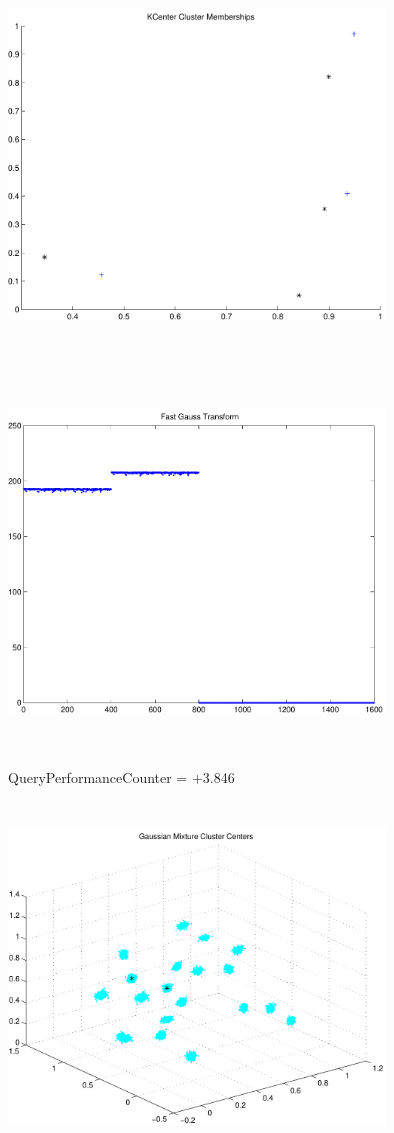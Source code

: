 \documentclass[9pt]{article}
\theoremstyle{plain}
\theoremstyle{definition}
\theoremstyle{remark}
\numberwithin{equation}{section}
\begin{document}
\includegraphics[width=10.0cm,height=10.0cm]{KCenterClusterMemberships_4_Centers.pdf}

\includegraphics[width=10.0cm,height=10.0cm]{FGT4_Centers.pdf}

QueryPerformanceCounter  =  +3.846
\includegraphics[width=10.0cm,height=10.0cm]{GaussianMixture_ClusterCenters20_Centers.pdf}
\end{document}
